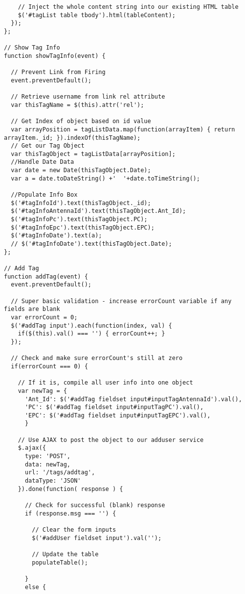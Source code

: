 \begin{lstlisting}
    // Inject the whole content string into our existing HTML table
    $('#tagList table tbody').html(tableContent);
  });
};

// Show Tag Info
function showTagInfo(event) {

  // Prevent Link from Firing
  event.preventDefault();

  // Retrieve username from link rel attribute
  var thisTagName = $(this).attr('rel');

  // Get Index of object based on id value
  var arrayPosition = tagListData.map(function(arrayItem) { return arrayItem._id; }).indexOf(thisTagName);
  // Get our Tag Object
  var thisTagObject = tagListData[arrayPosition];
  //Handle Date Data
  var date = new Date(thisTagObject.Date);
  var a = date.toDateString() +'  '+date.toTimeString();

  //Populate Info Box
  $('#tagInfoId').text(thisTagObject._id);
  $('#tagInfoAntennaId').text(thisTagObject.Ant_Id);
  $('#tagInfoPc').text(thisTagObject.PC);
  $('#tagInfoEpc').text(thisTagObject.EPC);
  $('#tagInfoDate').text(a);
  // $('#tagInfoDate').text(thisTagObject.Date);
};

// Add Tag
function addTag(event) {
  event.preventDefault();

  // Super basic validation - increase errorCount variable if any fields are blank
  var errorCount = 0;
  $('#addTag input').each(function(index, val) {
    if($(this).val() === '') { errorCount++; }
  });

  // Check and make sure errorCount's still at zero
  if(errorCount === 0) {

    // If it is, compile all user info into one object
    var newTag = {
      'Ant_Id': $('#addTag fieldset input#inputTagAntennaId').val(),
      'PC': $('#addTag fieldset input#inputTagPC').val(),
      'EPC': $('#addTag fieldset input#inputTagEPC').val(),
      }

    // Use AJAX to post the object to our adduser service
    $.ajax({
      type: 'POST',
      data: newTag,
      url: '/tags/addtag',
      dataType: 'JSON'
    }).done(function( response ) {

      // Check for successful (blank) response
      if (response.msg === '') {

        // Clear the form inputs
        $('#addUser fieldset input').val('');

        // Update the table
        populateTable();

      }
      else {


\end{lstlisting}
